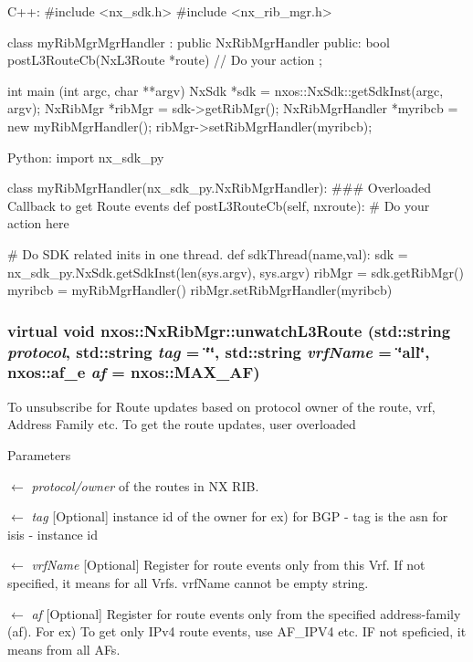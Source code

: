 \begin{DoxyCode}
  C++:
     #include <nx_sdk.h>
     #include <nx_rib_mgr.h>

     class myRibMgrMgrHandler : public NxRibMgrHandler {
        public:
           bool postL3RouteCb(NxL3Route *route) {
                // Do your action
           }
     };

     int  main (int argc, char **argv)
     {
          NxSdk    *sdk = nxos::NxSdk::getSdkInst(argc, argv);
          NxRibMgr *ribMgr = sdk->getRibMgr();
          NxRibMgrHandler *myribcb = new myRibMgrHandler();
          ribMgr->setRibMgrHandler(myribcb);
     }

  Python:
     import nx_sdk_py

     class myRibMgrHandler(nx_sdk_py.NxRibMgrHandler):
     ### Overloaded Callback to get Route events
           def postL3RouteCb(self, nxroute):
               # Do your action here

     # Do SDK related inits in one thread.
     def sdkThread(name,val):
         sdk = nx_sdk_py.NxSdk.getSdkInst(len(sys.argv), sys.argv)
         ribMgr = sdk.getRibMgr()
         myribcb = myRibMgrHandler()
         ribMgr.setRibMgrHandler(myribcb)
\end{DoxyCode}
 \hypertarget{classnxos_1_1NxRibMgr_a1dc61ed1d830f50ea947707576d75b99}{
\subsubsection[{unwatchL3Route}]{\setlength{\rightskip}{0pt plus 5cm}virtual void nxos::NxRibMgr::unwatchL3Route (std::string {\em protocol}, \/  std::string {\em tag} = {\ttfamily \char`\"{}\char`\"{}}, \/  std::string {\em vrfName} = {\ttfamily \char`\"{}all\char`\"{}}, \/  nxos::af\_\-e {\em af} = {\ttfamily nxos::MAX\_\-AF})}}
\label{classnxos_1_1NxRibMgr_a1dc61ed1d830f50ea947707576d75b99}
To unsubscribe for Route updates based on protocol owner of the route, vrf, Address Family etc. To get the route updates, user overloaded 
\begin{DoxyParams}{Parameters}
\item[\mbox{$\leftarrow$} {\em protocol/owner}]of the routes in NX RIB. \item[\mbox{$\leftarrow$} {\em tag}]\mbox{[}Optional\mbox{]} instance id of the owner for ex) for BGP -\/ tag is the asn for isis -\/ instance id \item[\mbox{$\leftarrow$} {\em vrfName}]\mbox{[}Optional\mbox{]} Register for route events only from this Vrf. If not specified, it means for all Vrfs. vrfName cannot be empty string. \item[\mbox{$\leftarrow$} {\em af}]\mbox{[}Optional\mbox{]} Register for route events only from the specified address-\/family (af). For ex) To get only IPv4 route events, use AF\_\-IPV4 etc. IF not speficied, it means from all AFs.\end{DoxyParams}

